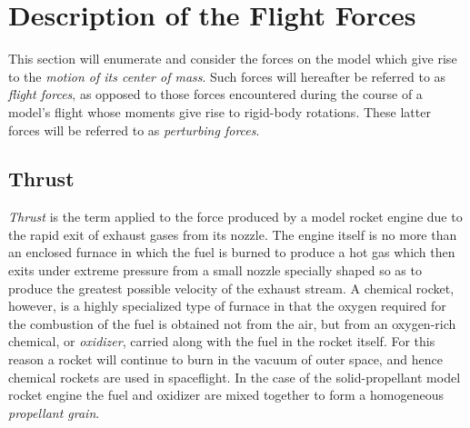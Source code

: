 
\section{Description of the Flight Forces}\label{ch1:sec:2}

This section will enumerate and consider the forces on the model which give rise to the
\emph{motion of its center of mass}. Such forces will hereafter be referred to as \emph{flight
forces}, as opposed to those forces encountered during the course of a model's flight whose
moments give rise to rigid-body rotations. These latter forces will be referred to as
\emph{perturbing forces}.

\subsection{Thrust}\label{ch1:sec:2.1}

\emph{Thrust} is the term applied to the force produced by a model rocket engine due to the rapid
exit of exhaust gases from its nozzle. The engine itself is no more than an enclosed furnace in
which the fuel is burned to produce a hot gas which then exits under extreme pressure from a small
nozzle specially shaped so as to produce the greatest possible velocity of the exhaust stream. A
chemical rocket, however, is a highly specialized type of furnace in that the oxygen required for
the combustion of the fuel is obtained not from the air, but from an oxygen-rich chemical, or
\emph{oxidizer}, carried along with the fuel in the rocket itself. For this reason a rocket will
continue to burn in the vacuum of outer space, and hence chemical rockets are used in
spaceflight. In the case of the solid-propellant model rocket engine the fuel and oxidizer are
mixed together to form a homogeneous \emph{propellant grain}.

